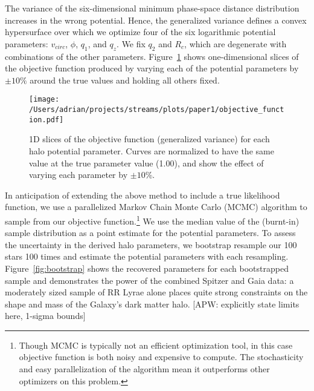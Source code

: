 \documentclass{emulateapj}
\begin{document}
The variance of the six-dimensional minimum phase-space distance distribution increases in the wrong potential. Hence, the generalized variance defines a convex hypersurface over
which we optimize four of the six logarithmic potential parameters:
$v_{circ}$, $\phi$, $q_1$, and $q_z$. We fix $q_2$ and $R_c$, which
are degenerate with combinations of the other
parameters. Figure~\ref{fig:objective} shows one-dimensional slices of
the objective function produced by varying each of the potential
parameters by $\pm10\%$ around the true values and holding all others
fixed.


\begin{figure}[h]
\begin{center}
\texttt{[image: /Users/adrian/projects/streams/plots/paper1/objective\_function.pdf]}
\caption{ 1D slices of the objective function (generalized variance) for each halo potential parameter. Curves are normalized to have the same value at the true parameter value (1.00), and show the effect of varying each parameter by $\pm10$\%. }\label{fig:objective}
\end{center}
\end{figure}

In anticipation of extending the above method to include a true
likelihood function, we use a parallelized Markov Chain Monte Carlo
(MCMC) algorithm \citep{foremanmackey2013} to sample from our
objective function.\footnote{Though MCMC is typically not an efficient
  optimization tool, in this case objective function is both noisy and
  expensive to compute. The stochasticity and easy parallelization of
  the algorithm mean it outperforms other optimizers on this problem.}
We use the median value of the (burnt-in) sample distribution as a
point estimate for the potential parameters. To assess the uncertainty
in the derived halo parameters, we bootstrap resample our 100 stars
100 times and estimate the potential parameters with each
resampling. Figure~\ref{fig:bootstrap} shows the recovered parameters
for each bootstrapped sample and demonstrates the power of the
combined Spitzer and Gaia data: a moderately sized sample of RR Lyrae
alone places quite strong constraints on the shape and mass of the
Galaxy's dark matter halo. [APW: explicitly state limits here, 1-sigma bounds]
\end{document}
